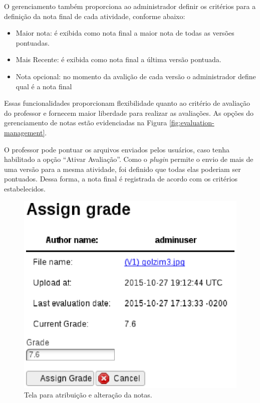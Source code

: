 O gerenciamento também proporciona ao administrador definir os critérios para a definição da nota final de cada atividade, conforme abaixo:
\begin{itemize}
\item Maior nota: é exibida como nota final a maior nota de todas as versões pontuadas.
\item Mais Recente: é exibida como nota final a última versão pontuada.
\item Nota opcional: no momento da avalição de cada versão o administrador define qual é a nota final
\end{itemize}

Essas funcionalidades proporcionam flexibilidade quanto ao critério de avaliação do professor e fornecem maior liberdade para realizar as avaliações. As opções do gerenciamento de notas estão evidenciadas na Figura \ref{fig:evaluation-management}.

O professor pode pontuar os arquivos enviados pelos usuários, caso tenha habilitado a opção ``Ativar Avaliação''. Como o \textit{plugin} permite o envio de mais de uma versão para a mesma atividade, foi definido que todas elas poderiam ser pontuados. Dessa forma, a nota final é registrada de acordo com os critérios estabelecidos.

\begin{figure}[h]
    \centering
    \includegraphics[keepaspectratio=true,scale=0.6]
      {figuras/assign-grade.eps}
    \caption{Tela para atribuição e alteração da notas.}
    \label{fig:assign-grade}
\end{figure}

